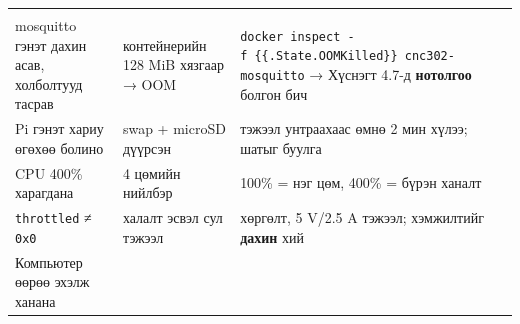 \begin{longtable}[]{@{}lll@{}}
\begin{minipage}[t]{0.30\columnwidth}
\end{minipage}\tabularnewline
\begin{minipage}[t]{0.30\columnwidth}\raggedright
mosquitto гэнэт дахин асав, холболтууд тасрав\strut
\end{minipage} & \begin{minipage}[t]{0.30\columnwidth}\raggedright
контейнерийн 128 MiB хязгаар → OOM\strut
\end{minipage} & \begin{minipage}[t]{0.30\columnwidth}\raggedright
\texttt{docker\ inspect\ -f\ \textquotesingle{}\{\{.State.OOMKilled\}\}\textquotesingle{}\ cnc302-mosquitto} → Хүснэгт 4.7-д \textbf{нотолгоо} болгон бич\strut
\end{minipage}\tabularnewline
\begin{minipage}[t]{0.30\columnwidth}\raggedright
Pi гэнэт хариу өгөхөө болино\strut
\end{minipage} & \begin{minipage}[t]{0.30\columnwidth}\raggedright
swap + microSD дүүрсэн\strut
\end{minipage} & \begin{minipage}[t]{0.30\columnwidth}\raggedright
тэжээл унтраахаас өмнө 2 мин хүлээ; шатыг буулга\strut
\end{minipage}\tabularnewline
\begin{minipage}[t]{0.30\columnwidth}\raggedright
CPU 400\% харагдана\strut
\end{minipage} & \begin{minipage}[t]{0.30\columnwidth}\raggedright
4 цөмийн нийлбэр\strut
\end{minipage} & \begin{minipage}[t]{0.30\columnwidth}\raggedright
100\% = нэг цөм, 400\% = бүрэн ханалт\strut
\end{minipage}\tabularnewline
\begin{minipage}[t]{0.30\columnwidth}\raggedright
\texttt{throttled} ≠ \texttt{0x0}\strut
\end{minipage} & \begin{minipage}[t]{0.30\columnwidth}\raggedright
халалт эсвэл сул тэжээл\strut
\end{minipage} & \begin{minipage}[t]{0.30\columnwidth}\raggedright
хөргөлт, 5 V/2.5 A тэжээл; хэмжилтийг \textbf{дахин} хий\strut
\end{minipage}\tabularnewline
\begin{minipage}[t]{0.30\columnwidth}\raggedright
Компьютер өөрөө эхэлж ханана\strut

\end{minipage}
\end{longtable}
